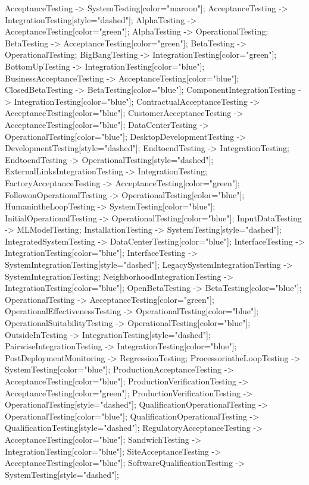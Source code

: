 \documentclass{article}
\begin{document}
{AcceptanceTesting -> SystemTesting[color="maroon"];
AcceptanceTesting -> IntegrationTesting[style="dashed"];
AlphaTesting -> AcceptanceTesting[color="green"];
AlphaTesting -> OperationalTesting;
BetaTesting -> AcceptanceTesting[color="green"];
BetaTesting -> OperationalTesting;
BigBangTesting -> IntegrationTesting[color="green"];
BottomUpTesting -> IntegrationTesting[color="blue"];
BusinessAcceptanceTesting -> AcceptanceTesting[color="blue"];
ClosedBetaTesting -> BetaTesting[color="blue"];
ComponentIntegrationTesting -> IntegrationTesting[color="blue"];
ContractualAcceptanceTesting -> AcceptanceTesting[color="blue"];
CustomerAcceptanceTesting -> AcceptanceTesting[color="blue"];
DataCenterTesting -> OperationalTesting[color="blue"];
DesktopDevelopmentTesting -> DevelopmentTesting[style="dashed"];
EndtoendTesting -> IntegrationTesting;
EndtoendTesting -> OperationalTesting[style="dashed"];
ExternalLinksIntegrationTesting -> IntegrationTesting;
FactoryAcceptanceTesting -> AcceptanceTesting[color="green"];
FollowonOperationalTesting -> OperationalTesting[color="blue"];
HumanintheLoopTesting -> SystemTesting[color="blue"];
InitialOperationalTesting -> OperationalTesting[color="blue"];
InputDataTesting -> MLModelTesting;
InstallationTesting -> SystemTesting[style="dashed"];
IntegratedSystemTesting -> DataCenterTesting[color="blue"];
InterfaceTesting -> IntegrationTesting[color="blue"];
InterfaceTesting -> SystemIntegrationTesting[style="dashed"];
LegacySystemIntegrationTesting -> SystemIntegrationTesting;
NeighborhoodIntegrationTesting -> IntegrationTesting[color="blue"];
OpenBetaTesting -> BetaTesting[color="blue"];
OperationalTesting -> AcceptanceTesting[color="green"];
OperationalEffectivenessTesting -> OperationalTesting[color="blue"];
OperationalSuitabilityTesting -> OperationalTesting[color="blue"];
OutsideInTesting -> IntegrationTesting[style="dashed"];
PairwiseIntegrationTesting -> IntegrationTesting[color="blue"];
PostDeploymentMonitoring -> RegressionTesting;
ProcessorintheLoopTesting -> SystemTesting[color="blue"];
ProductionAcceptanceTesting -> AcceptanceTesting[color="blue"];
ProductionVerificationTesting -> AcceptanceTesting[color="green"];
ProductionVerificationTesting -> OperationalTesting[style="dashed"];
QualificationOperationalTesting -> OperationalTesting[color="blue"];
QualificationOperationalTesting -> QualificationTesting[style="dashed"];
RegulatoryAcceptanceTesting -> AcceptanceTesting[color="blue"];
SandwichTesting -> IntegrationTesting[color="blue"];
SiteAcceptanceTesting -> AcceptanceTesting[color="blue"];
SoftwareQualificationTesting -> SystemTesting[style="dashed"];
}
\end{document}
